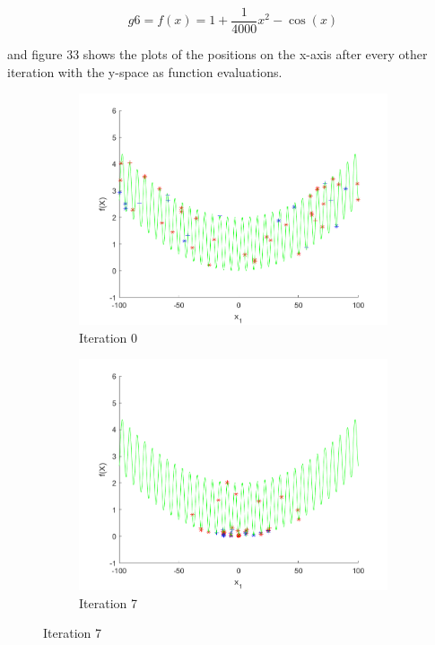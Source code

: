$$
  g6=f(x) = 1 + \frac{1}{4000}x^2 - \cos(x)
$$

and figure 33 shows the plots of the positions on the x-axis after every other iteration with the y-space as function evaluations.

\begin{figure}
  \centering
 \begin{subfigure}[b]{0.4\textwidth}
   \includegraphics[width=\textwidth]{img/smpl/grwnk1d/loa-iter-0}
   \caption{Iteration 0}
   \label{fig:s6-iter-0}
 \end{subfigure}
 \begin{subfigure}[b]{0.4\textwidth}
   \includegraphics[width=\textwidth]{img/smpl/grwnk1d/loa-iter-7}
   \caption{Iteration 7}

\end{subfigure}
\end{figure}

